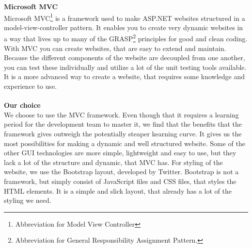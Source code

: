 \documentclass[a4paper,11pt,report]{article}
\begin{document}
\textbf{Microsoft MVC} \\
Microsoft MVC\footnote{Abbreviation for Model View Controller} is a framework used to make ASP.NET websites structured in a model-view-controller pattern. It enables you to create very dynamic websites in a way that lives up to many of the GRASP\footnote{Abbreviation for General Responsibility Assignment Pattern.} principles for good and clean coding. With MVC you can create websites, that are easy to extend and maintain. Because the different components of the website are decoupled from one another, you can test these individually and utilize a lot of the unit testing tools available. It is a more advanced way to create a website, that requires some knowledge and experience to use. \\ \\

\textbf{Our choice} \\
We choose to use the MVC framework. Even though that it requires a learning period for the development team to master it, we find that the benefits that the framework gives outweigh the potentially steaper kearning curve. It gives us the most possibilities for making a dynamic and well structured website. Some of the other GUI technologies are more simple, lightweight and easy to use, but they lack a lot of the structure and dynamic, that MVC has. For styling of the website, we use the Bootstrap layout, developed by Twitter. Bootstrap is not a framework, but simply consist of JavaScript files and CSS files, that styles the HTML elements. It is a simple and slick layout, that already has a lot of the styling we need.
\end{document}
